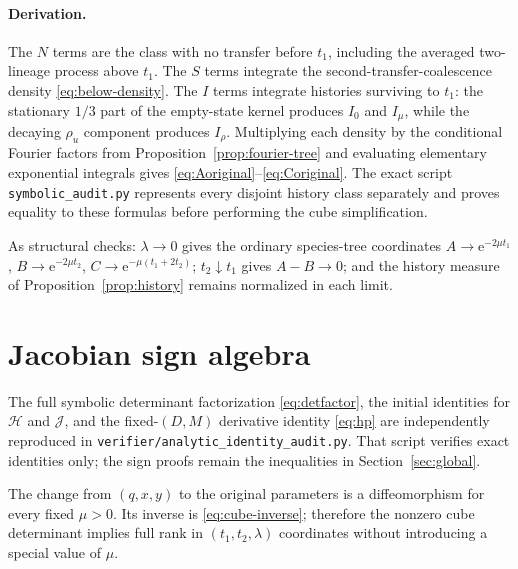 \documentclass[11pt]{article}
\newcommand{\e}{\mathrm e}
\begin{document}
\paragraph{Derivation.}
The $N$ terms are the class with no transfer before $t_1$, including the averaged two-lineage process above $t_1$.  The $S$ terms integrate the second-transfer-coalescence density \eqref{eq:below-density}.  The $I$ terms integrate histories surviving to $t_1$: the stationary $1/3$ part of the empty-state kernel produces $I_0$ and $I_\mu$, while the decaying $\rho_u$ component produces $I_\rho$.  Multiplying each density by the conditional Fourier factors from Proposition~\ref{prop:fourier-tree} and evaluating elementary exponential integrals gives \eqref{eq:Aoriginal}--\eqref{eq:Coriginal}.  The exact script \texttt{symbolic\_audit.py} represents every disjoint history class separately and proves equality to these formulas before performing the cube simplification.

As structural checks: $\lambda\to0$ gives the ordinary species-tree coordinates $A\to\e^{-2\mu t_1}$, $B\to\e^{-2\mu t_2}$, $C\to\e^{-\mu(t_1+2t_2)}$; $t_2\downarrow t_1$ gives $A-B\to0$; and the history measure of Proposition~\ref{prop:history} remains normalized in each limit.

\section{Jacobian sign algebra}\label{app:jacobian}
The full symbolic determinant factorization \eqref{eq:detfactor}, the initial identities for $\mathcal H$ and $\mathcal J$, and the fixed-$(D,M)$ derivative identity \eqref{eq:hp} are independently reproduced in \texttt{verifier/analytic\_identity\_audit.py}.  That script verifies exact identities only; the sign proofs remain the inequalities in Section~\ref{sec:global}.

The change from $(q,x,y)$ to the original parameters is a diffeomorphism for every fixed $\mu>0$.  Its inverse is \eqref{eq:cube-inverse}; therefore the nonzero cube determinant implies full rank in $(t_1,t_2,\lambda)$ coordinates without introducing a special value of $\mu$.
\end{document}
